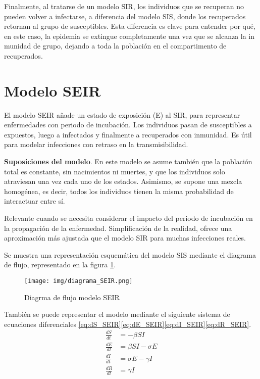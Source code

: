 Finalmente, al tratarse de un modelo SIR, los individuos que se recuperan no pueden volver a infectarse, a diferencia del modelo SIS, donde los recuperados retornan al grupo de susceptibles. Esta diferencia es clave para entender por qué, en este caso, la epidemia se extingue completamente una vez que se alcanza la in munidad de grupo, dejando a toda la población en el compartimento de recuperados.




\section{Modelo SEIR}
El modelo SEIR añade un estado de exposición (E) al SIR, para representar enfermedades con periodo de incubación. Los individuos pasan de susceptibles a expuestos, luego a infectados y finalmente a recuperados con inmunidad. Es útil para modelar infecciones con retraso en la transmisibilidad.

\textbf{Suposiciones del modelo}. En este modelo se asume también que la población total es constante, sin nacimientos ni muertes, y que los individuos solo atraviesan una vez cada uno de los estados. Asimismo, se supone una mezcla homogénea, es decir, todos los individuos tienen la misma probabilidad de interactuar entre sí.

Relevante cuando se necesita considerar el impacto del periodo de incubación en la propagación de la enfermedad. Simplificación de la realidad, ofrece una aproximación más ajustada que el modelo SIR para muchas infecciones reales.

Se muestra una representación esquemática del modelo SIS mediante el diagrama de flujo, representado en la figura \ref{fig:diagrama SEIR}.
\begin{figure}[H]
    \centering
    \texttt{[image: img/diagrama\_SEIR.png]}
    \caption{Diagrma de flujo modelo SEIR}
    \label{fig:diagrama SEIR}
    \vspace{0.5cm} %
\end{figure}

También se puede representar el modelo mediante el siguiente sistema de ecuaciones diferenciales \eqref{eq:dS_SEIR}\eqref{eq:dE_SEIR}\eqref{eq:dI_SEIR}\eqref{eq:dR_SEIR}. 
\begin{align}
\frac{dS}{dt} &= -\beta SI \label{eq:dS_SEIR} \\
\frac{dE}{dt} &= \beta SI - \sigma E \label{eq:dE_SEIR} \\
\frac{dI}{dt} &= \sigma E - \gamma I \label{eq:dI_SEIR} \\
\frac{dR}{dt} &= \gamma I \label{eq:dR_SEIR}
\end{align}

